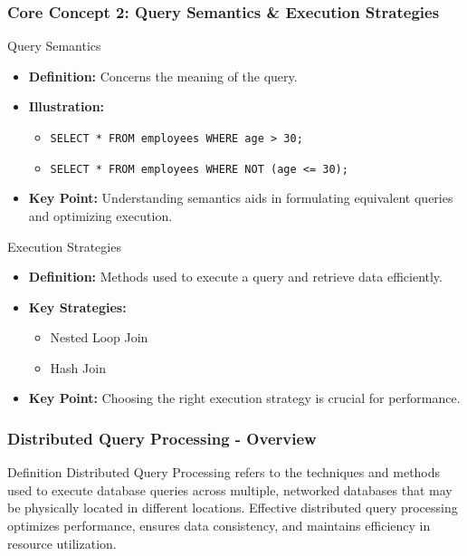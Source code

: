 \documentclass[aspectratio=169]{beamer}
\begin{document}
\begin{frame}[fragile]
    \frametitle{Core Concept 2: Query Semantics \& Execution Strategies}
    \begin{block}{Query Semantics}
        \begin{itemize}
            \item \textbf{Definition:} Concerns the meaning of the query.
            \item \textbf{Illustration:} 
                \begin{itemize}
                    \item \lstinline|SELECT * FROM employees WHERE age > 30;|
                    \item \lstinline|SELECT * FROM employees WHERE NOT (age <= 30);|
                \end{itemize}
            \item \textbf{Key Point:} Understanding semantics aids in formulating equivalent queries and optimizing execution.
        \end{itemize}
    \end{block}
    
    \begin{block}{Execution Strategies}
        \begin{itemize}
            \item \textbf{Definition:} Methods used to execute a query and retrieve data efficiently.
            \item \textbf{Key Strategies:}
                \begin{itemize}
                    \item Nested Loop Join
                    \item Hash Join
                \end{itemize}
            \item \textbf{Key Point:} Choosing the right execution strategy is crucial for performance.
        \end{itemize}
    \end{block}
\end{frame}

\begin{frame}[fragile]
    \frametitle{Distributed Query Processing - Overview}
    \begin{block}{Definition}
        Distributed Query Processing refers to the techniques and methods used to execute database queries across multiple, networked databases that may be physically located in different locations.
        Effective distributed query processing optimizes performance, ensures data consistency, and maintains efficiency in resource utilization.
    \end{block}
\end{frame}
\end{document}
